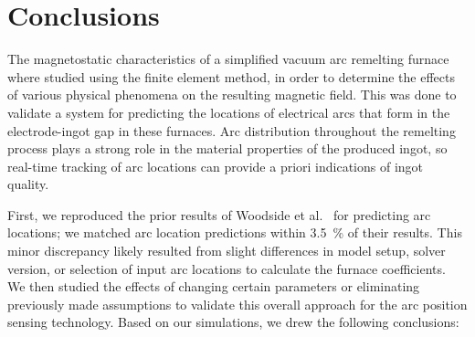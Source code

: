 \documentclass[onehalf,11pt]{beavtex}
\begin{document}
\section{Conclusions}
\label{s:conclusions}

The magnetostatic characteristics of a simplified vacuum arc remelting furnace where studied using the finite element method, in order to determine the effects of various physical phenomena on the resulting magnetic field.
This was done to validate a system for predicting the locations of electrical arcs that form in the electrode-ingot gap in these furnaces.
Arc distribution throughout the remelting process plays a strong role in the material properties of the produced ingot, so real-time tracking of arc locations can provide a priori indications of ingot quality.

First, we reproduced the prior results of Woodside et al.~\cite{Woodside:2013cf} for predicting arc locations; we matched arc location predictions within \SI{3.5}{\percent} of their results.
This minor discrepancy likely resulted from slight differences in model setup, solver version, or selection of input arc locations to calculate the furnace coefficients.
We then studied the effects of changing certain parameters or eliminating previously made assumptions to validate this overall approach for the arc position sensing technology.
Based on our simulations, we drew the following conclusions:
\end{document}
